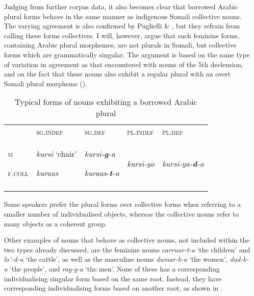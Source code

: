 \documentclass[output=paper]{langsci/langscibook}
\begin{document}
Judging from further corpus data, it also becomes clear that borrowed Arabic plural forms behave in the same manner as indigenous Somali collective nouns. The varying agreement is also confirmed by Puglielli \& \citet[86]{Siyaad1984}, but they refrain from calling these forms collectives. I will, however, argue that such feminine forms, containing Arabic plural morphemes, are not plurals in Somali, but collective forms which are grammatically singular. The argument is based on the same type of variation in agreement as that encountered with nouns of the 5th declension, and on the fact that these nouns also exhibit a regular plural with an overt Somali plural morpheme ().
 
\begin{table}
\caption{Typical forms of nouns exhibiting a borrowed Arabic plural}
\label{tab:12}
\begin{tabularx}{\textwidth}{XXXXX} & {\textsc{sg.indef}} & {\textsc{sg.def}} & {\textsc{pl.indef}} & {\textsc{pl.def}}\\
\lsptoprule
{\textsc{m}}

{\textsc{f.coll}} & {\textit{kursi} ‘chair’}

{\textit{kuraas}} & {\textit{kursi-}\textbf{\textit{g}}\textit{{}-a}}

{\textit{kuraas-}\textbf{\textit{t}}\textit{{}-a}} & {\textit{kursi-yo}} & {\textit{kursi-ya-}\textbf{\textit{d}}\textit{{}-a}}\\
\lspbottomrule
\end{tabularx}

\end{table} 

Some speakers prefer the plural forms over collective forms when referring to a smaller number of individualised objects, whereas the collective nouns refer to many objects as a coherent group. 

Other examples of nouns that behave as collective nouns, not included within the two types already discussed, are the feminine nouns \textit{carruur-t-a} ‘the children’ and \textit{lo’-d-a} ‘the cattle’, as well as the masculine nouns \textit{dumar-k-a} ‘the women’, \textit{dad-k-a} ‘the people’, and \textit{rag-g-a} ‘the men’. None of these has a corresponding individualising singular form based on the same root. Instead, they have corresponding individualising forms based on another root, as shown in .
\end{document}
